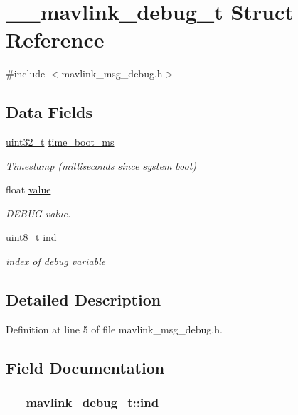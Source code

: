 \hypertarget{struct____mavlink__debug__t}{\section{\-\_\-\-\_\-mavlink\-\_\-debug\-\_\-t Struct Reference}
\label{struct____mavlink__debug__t}
}


{\ttfamily \#include $<$mavlink\-\_\-msg\-\_\-debug.\-h$>$}

\subsection*{Data Fields}
\begin{DoxyCompactItemize}
\item 
\hyperlink{stdint_8h_a435d1572bf3f880d55459d9805097f62}{uint32\-\_\-t} \hyperlink{struct____mavlink__debug__t_afc1d1057d77ded488ac7b5034411604c}{time\-\_\-boot\-\_\-ms}
\begin{DoxyCompactList}\small\item\em Timestamp (milliseconds since system boot) \end{DoxyCompactList}\item 
float \hyperlink{struct____mavlink__debug__t_aef9d0e91db46dff84494856146dcbcbe}{value}
\begin{DoxyCompactList}\small\item\em D\-E\-B\-U\-G value. \end{DoxyCompactList}\item 
\hyperlink{stdint_8h_aba7bc1797add20fe3efdf37ced1182c5}{uint8\-\_\-t} \hyperlink{struct____mavlink__debug__t_a540aecd3c98dd395f80edd92acab7c3d}{ind}
\begin{DoxyCompactList}\small\item\em index of debug variable \end{DoxyCompactList}\end{DoxyCompactItemize}


\subsection{Detailed Description}


Definition at line 5 of file mavlink\-\_\-msg\-\_\-debug.\-h.



\subsection{Field Documentation}
\hypertarget{struct____mavlink__debug__t_a540aecd3c98dd395f80edd92acab7c3d}{
\subsubsection[{ind}]{ \-\_\-\-\_\-mavlink\-\_\-debug\-\_\-t\-::ind}}\label{struct____mavlink__debug__t_a540aecd3c98dd395f80edd92acab7c3d}


